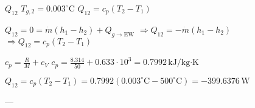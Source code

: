 \( Q_{12} \)  
\( T_{g,2} = 0.003^\circ \text{C} \)  
\( Q_{12} = c_p (T_2 - T_1) \)  

\( Q_{12} = 0 = \dot{m} (h_1 - h_2) + Q_{g \to \text{EW}} \)  
\( \Rightarrow Q_{12} = -\dot{m} (h_1 - h_2) \)  
\( \Rightarrow Q_{12} = c_p (T_2 - T_1) \)  

\( c_p = \frac{R}{M} + c_V \)  
\( c_p = \frac{8.314}{50} + 0.633 \cdot 10^3 = 0.7992 \, \text{kJ/kg·K} \)  

\( Q_{12} = c_p (T_2 - T_1) = 0.7992 (0.003^\circ \text{C} - 500^\circ \text{C}) = -399.6376 \, \text{W} \)  

---